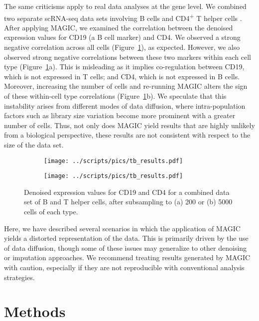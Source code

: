 \documentclass[10pt,letterpaper]{article}
\begin{document}
The same criticisms apply to real data analyses at the gene level.
We combined two separate scRNA-seq data sets involving B cells and CD4\textsuperscript{+} T helper cells \cite{zheng2017massively}.
After applying MAGIC, we examined the correlation between the denoised expression values for CD19 (a B cell marker) and CD4. 
We observed a strong negative correlation across all cells (Figure~\ref{fig:tb}), as expected.
However, we also observed strong negative correlations between these two markers within each cell type (Figure~\ref{fig:tb}a).
This is misleading as it implies co-regulation between CD19, which is not expressed in T cells; and CD4, which is not expressed in B cells.
Moreover, increasing the number of cells and re-running MAGIC alters the sign of these within-cell type correlations (Figure~\ref{fig:tb}b).
We speculate that this instability arises from different modes of data diffusion, where intra-population factors such as library size variation become more prominent with a greater number of cells.
Thus, not only does MAGIC yield results that are highly unlikely from a biological perspective, these results are not consistent with respect to the size of the data set.

\begin{figure}[btp]
\centering
\begin{subfigure}[b]{0.49\textwidth}
    \texttt{[image: ../scripts/pics/tb\_results.pdf]}
    \caption{}
\end{subfigure}
\begin{subfigure}[b]{0.49\textwidth}
    \texttt{[image: ../scripts/pics/tb\_results.pdf]}
    \caption{}
\end{subfigure}
\caption{Denoised expression values for CD19 and CD4 for a combined data set of B and T helper cells, after subsampling to (a) 200 or (b) 5000 cells of each type.}
\label{fig:tb}
\end{figure}

Here, we have described several scenarios in which the application of MAGIC yields a distorted representation of the data.
This is primarily driven by the use of data diffusion, though some of these issues may generalize to other denoising or imputation approaches.
We recommend treating results generated by MAGIC with caution, especially if they are not reproducible with conventional analysis strategies.

\section*{Methods}
\end{document}
